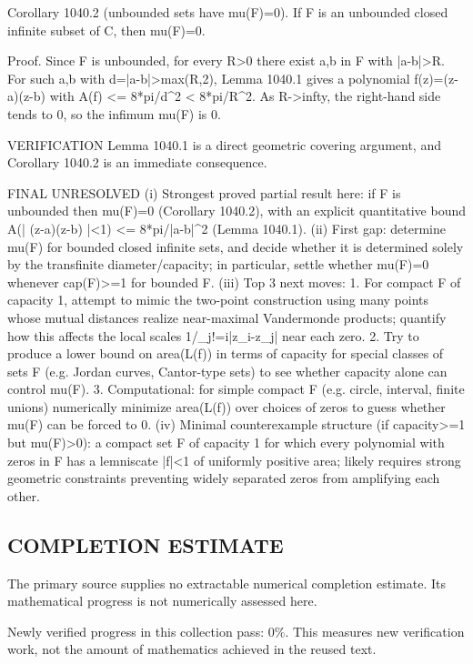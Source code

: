 Corollary 1040.2 (unbounded sets have mu(F)=0).
If F is an unbounded closed infinite subset of C, then mu(F)=0.

Proof.
Since F is unbounded, for every R>0 there exist a,b in F with |a-b|>R.
For such a,b with d=|a-b|>max(R,2), Lemma 1040.1 gives a polynomial f(z)=(z-a)(z-b) with
  A(f) <= 8*pi/d^2 < 8*pi/R^2.
As R->infty, the right-hand side tends to 0, so the infimum mu(F) is 0.

VERIFICATION
Lemma 1040.1 is a direct geometric covering argument, and Corollary 1040.2 is an immediate consequence.

FINAL
UNRESOLVED
(i) Strongest proved partial result here: if F is unbounded then mu(F)=0 (Corollary 1040.2), with an explicit quantitative bound A({| (z-a)(z-b) |<1}) <= 8*pi/|a-b|^2 (Lemma 1040.1).
(ii) First gap: determine mu(F) for bounded closed infinite sets, and decide whether it is determined solely by the transfinite diameter/capacity; in particular, settle whether mu(F)=0 whenever cap(F)>=1 for bounded F.
(iii) Top 3 next moves:
  1. For compact F of capacity 1, attempt to mimic the two-point construction using many points whose mutual distances realize near-maximal Vandermonde products; quantify how this affects the local scales 1/\prod_{j!=i}|z_i-z_j| near each zero.
  2. Try to produce a lower bound on area(L(f)) in terms of capacity for special classes of sets F (e.g. Jordan curves, Cantor-type sets) to see whether capacity alone can control mu(F).
  3. Computational: for simple compact F (e.g. circle, interval, finite unions) numerically minimize area(L(f)) over choices of zeros to guess whether mu(F) can be forced to 0.
(iv) Minimal counterexample structure (if capacity>=1 but mu(F)>0): a compact set F of capacity 1 for which every polynomial with zeros in F has a lemniscate |f|<1 of uniformly positive area; likely requires strong geometric constraints preventing widely separated zeros from amplifying each other.



\subsection*{COMPLETION ESTIMATE}
The primary source supplies no extractable numerical completion estimate. Its mathematical progress is not numerically assessed here.

Newly verified progress in this collection pass: $0\%$. This measures new verification work, not the amount of mathematics achieved in the reused text.
